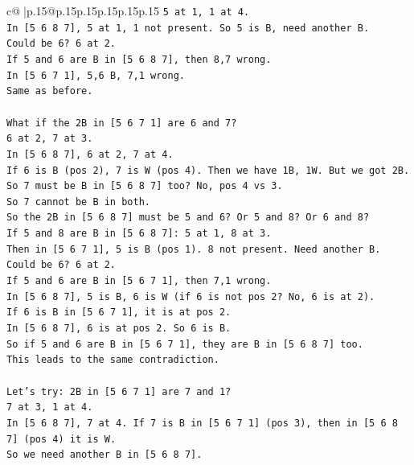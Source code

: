 \documentclass{article}
\begin{document}
{\begin{supertabular}{c@{$\;$}|p{.15\linewidth}@{}p{.15\linewidth}p{.15\linewidth}p{.15\linewidth}p{.15\linewidth}p{.15\linewidth}}
{{{\texttt{5 at 1, 1 at 4.} \\
\texttt{In {[}5 6 8 7{]}, 5 at 1, 1 not present. So 5 is B, need another B.} \\
\texttt{Could be 6? 6 at 2.} \\
\texttt{If 5 and 6 are B in {[}5 6 8 7{]}, then 8,7 wrong.} \\
\texttt{In {[}5 6 7 1{]}, 5,6 B, 7,1 wrong.} \\
\texttt{Same as before.} \\
\\ 
\texttt{What if the 2B in {[}5 6 7 1{]} are 6 and 7?} \\
\texttt{6 at 2, 7 at 3.} \\
\texttt{In {[}5 6 8 7{]}, 6 at 2, 7 at 4.} \\
\texttt{If 6 is B (pos 2), 7 is W (pos 4). Then we have 1B, 1W. But we got 2B.} \\
\texttt{So 7 must be B in {[}5 6 8 7{]} too? No, pos 4 vs 3.} \\
\texttt{So 7 cannot be B in both.} \\
\texttt{So the 2B in {[}5 6 8 7{]} must be 5 and 6? Or 5 and 8? Or 6 and 8?} \\
\texttt{If 5 and 8 are B in {[}5 6 8 7{]}: 5 at 1, 8 at 3.} \\
\texttt{Then in {[}5 6 7 1{]}, 5 is B (pos 1). 8 not present. Need another B.} \\
\texttt{Could be 6? 6 at 2.} \\
\texttt{If 5 and 6 are B in {[}5 6 7 1{]}, then 7,1 wrong.} \\
\texttt{In {[}5 6 8 7{]}, 5 is B, 6 is W (if 6 is not pos 2? No, 6 is at 2).} \\
\texttt{If 6 is B in {[}5 6 7 1{]}, it is at pos 2.} \\
\texttt{In {[}5 6 8 7{]}, 6 is at pos 2. So 6 is B.} \\
\texttt{So if 5 and 6 are B in {[}5 6 7 1{]}, they are B in {[}5 6 8 7{]} too.} \\
\texttt{This leads to the same contradiction.} \\
\\ 
\texttt{Let's try: 2B in {[}5 6 7 1{]} are 7 and 1?} \\
\texttt{7 at 3, 1 at 4.} \\
\texttt{In {[}5 6 8 7{]}, 7 at 4. If 7 is B in {[}5 6 7 1{]} (pos 3), then in {[}5 6 8 7{]} (pos 4) it is W.} \\
\texttt{So we need another B in {[}5 6 8 7{]}.} \\
}}}
\end{supertabular}}
\end{document}
